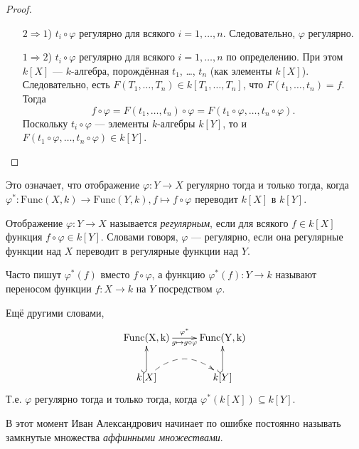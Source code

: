 \documentclass[12pt,a4paper]{article}
\newcommand{\Func}{\mathrm{Func}}
\begin{document}
    \begin{proof}
        \begin{itemize}
            \item[$2 \Rightarrow 1$)] $t_i \circ \varphi$ регулярно для всякого $i = 1, \dots, n$. Следовательно, $\varphi$ регулярно.
            \item[$1 \Rightarrow 2$)] $t_i \circ \varphi$ регулярно для всякого $i = 1, \dots, n$ по определению. При этом $k[X]$ --- $k$-алгебра, порождённая $t_1$, \dots, $t_n$ (как элементы $k[X]$). Следовательно, есть $F(T_1, \dots, T_n) \in k[T_1, \dots, T_n]$, что $F(t_1, \dots, t_n) = f$. Тогда
                \[f \circ \varphi = F(t_1, \dots, t_n) \circ \varphi = F(t_1 \circ \varphi, \dots, t_n \circ \varphi).\]
                Поскольку $t_i \circ \varphi$ --- элементы $k$-алгебры $k[Y]$, то и $F(t_1 \circ \varphi, \dots, t_n \circ \varphi) \in k[Y]$.
        \end{itemize}
    \end{proof}

    \begin{remark}
        Это означает, что отображение $\varphi: Y \to X$ регулярно тогда и только тогда, когда $\varphi^*: \Func(X, k) \to \Func(Y, k), f \mapsto f \circ \varphi$ переводит $k[X]$ в $k[Y]$.
    \end{remark}

    \begin{definition}
        Отображение $\varphi: Y \to X$ называется \emph{регулярным}, если для всякого $f \in k[X]$ функция $f \circ \varphi \in k[Y]$. Словами говоря, $\varphi$ --- регулярно, если она регулярные функции над $X$ переводит в регулярные функции над $Y$.

        Часто пишут $\varphi^*(f)$ вместо $f \circ \varphi$, а функцию $\varphi^*(f): Y \to k$ называют переносом функции $f: X \to k$ на $Y$ посредством $\varphi$.

        Ещё другими словами,
        \[
            \xymatrix{
                \mathrm{Func(X, k)} \ar[r]^{\varphi^*}_{g \mapsto g \circ \varphi}& \mathrm{Func(Y, k)}\\
                k[X] \ar@{^(->}[u] \ar@{-->}@(ur, ul)[r]& k[Y] \ar@{^(->}[u]
            }
        \]
        Т.е. $\varphi$ регулярно тогда и только тогда, когда $\varphi^*(k[X]) \subseteq k[Y]$.
    \end{definition}

    \begin{remark*}
        В этот момент Иван Александрович начинает по ошибке постоянно называть замкнутые множества \emph{аффинными множествами}.
    \end{remark*}
\end{document}
